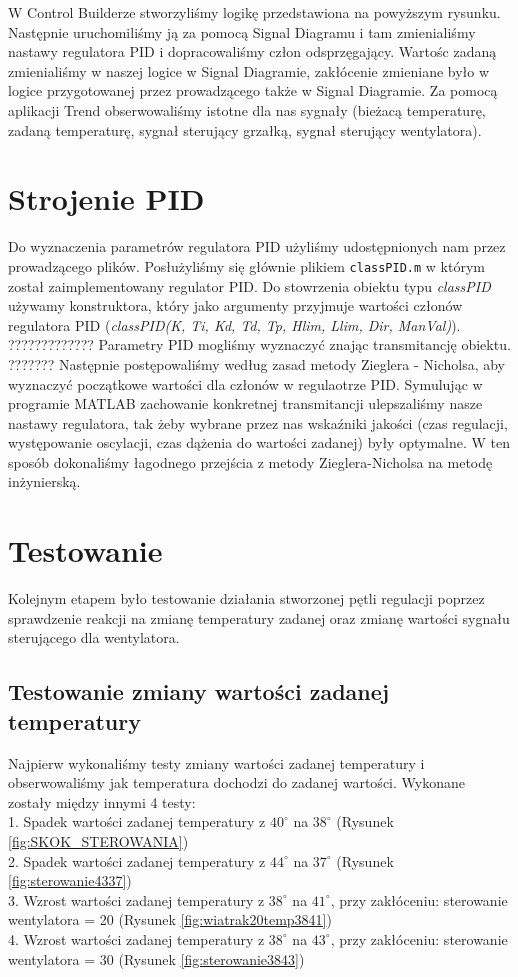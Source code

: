 \documentclass[12pt, a4paper]{article}
\begin{document}
W Control Builderze stworzyliśmy logikę przedstawiona na powyższym rysunku. Następnie uruchomiliśmy ją za pomocą Signal Diagramu i tam zmienialiśmy nastawy regulatora PID i dopracowaliśmy człon odsprzęgający. Wartośc zadaną zmienialiśmy w naszej logice w Signal Diagramie, zakłócenie zmieniane było w logice przygotowanej przez prowadzącego także w Signal Diagramie. Za pomocą aplikacji Trend obserwowaliśmy istotne dla nas sygnały (bieżacą temperaturę, zadaną temperaturę, sygnał sterujący grzałką, sygnał sterujący wentylatora).

\section{Strojenie PID}
Do wyznaczenia parametrów regulatora PID użyliśmy udostępnionych nam przez prowadzącego plików. Posłużyliśmy się głównie plikiem \verb|classPID.m| w którym został zaimplementowany regulator PID. Do stowrzenia obiektu typu \textit{classPID} używamy konstruktora, który jako argumenty przyjmuje wartości członów regulatora PID (\textit{classPID(K, Ti, Kd, Td, Tp, Hlim, Llim, Dir, ManVal)}). ????????????? Parametry PID mogliśmy wyznaczyć znając transmitancję obiektu. ??????? Następnie postępowaliśmy według zasad metody Zieglera - Nicholsa, aby wyznaczyć początkowe wartości dla członów w regulaotrze PID. Symulując w programie MATLAB zachowanie konkretnej transmitancji ulepszaliśmy nasze nastawy regulatora, tak żeby wybrane przez nas wskaźniki jakości (czas regulacji, występowanie oscylacji, czas dążenia do wartości zadanej) były optymalne. W ten sposób dokonaliśmy łagodnego przejścia z metody Zieglera-Nicholsa na metodę inżynierską. 
\newpage
\section{Testowanie}
Kolejnym etapem było testowanie działania stworzonej pętli regulacji poprzez sprawdzenie reakcji na zmianę temperatury zadanej oraz zmianę wartości sygnału sterującego dla wentylatora. 

\subsection{Testowanie zmiany wartości zadanej temperatury}
Najpierw wykonaliśmy testy zmiany wartości zadanej temperatury i obserwowaliśmy jak temperatura dochodzi do zadanej wartości. Wykonane zostały między innymi 4 testy: \\
1. Spadek wartości zadanej temperatury z  $40^\circ$ na $38^\circ$ (Rysunek \ref{fig:SKOK_STEROWANIA}) \\
2. Spadek wartości zadanej temperatury z  $44^\circ$ na $37^\circ$ (Rysunek \ref{fig:sterowanie4337}) \\
3. Wzrost wartości zadanej temperatury z  $38^\circ$ na $41^\circ$, przy zakłóceniu: sterowanie wentylatora = 20 (Rysunek \ref{fig:wiatrak20temp3841}) \\
4. Wzrost wartości zadanej temperatury z  $38^\circ$ na $43^\circ$, przy zakłóceniu: sterowanie wentylatora = 30  (Rysunek \ref{fig:sterowanie3843}) \\
\end{document}
